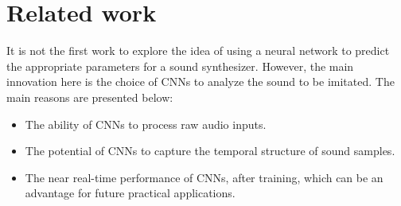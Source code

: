 \documentclass[sigconf,natbib=false]{acmart}
\begin{document}






\section{Related work} \label{sec:related}

It is not the first work to explore the idea of using a neural network to predict the appropriate parameters for a sound synthesizer. However, the main innovation here is the choice of CNNs to analyze the sound to be imitated. The main reasons are presented below:

\begin{itemize}
\item The ability of CNNs to process raw audio inputs.
\item The potential of CNNs to capture the temporal structure of sound samples.
\item The near real-time performance of CNNs, after training, which can be an advantage for future practical applications.
\end{itemize}
\end{document}
